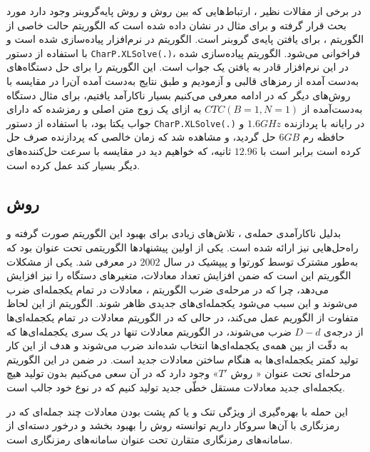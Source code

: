 در برخی از مقالات نظیر 
\cite{sugita2004relation}،
ارتباط‌هایی که بین روش 
و روش پایه‌گروبنر  وجود دارد مورد بحث قرار گرفته و  برای مثال در 
\cite{ars2004comparison}
نشان داده شده است که الگوریتم 
حالت خاصی از الگوریتم 
،
برای یافتن پایه‌ی گروبنر است.  الگوریتم 
در نرم‌افزار  
\cite{ApCoCoA}
پیاده‌سازی شده است و با  استفاده از دستور 
\texttt{CharP.XLSolve(.)}، 
فراخوانی می‌شود.   الگوریتم 
پیاده‌سازی شده در این نرم‌افزار قادر به یافتن یک جواب است. این الگوریتم را برای حل دستگاه‌های به‌دست آمده از رمز‌های قالبی 
و 
آزمودیم و طبق نتایج به‌دست آمده آن‌را در مقایسه با روش‌های دیگر که در ادامه معرفی می‌کنیم بسیار ناکارآمد یافتیم، برای مثال   دستگاه به‌دست‌آمده از 
$CTC(B = 1, N = 1)$
به ازای یک زوج متن اصلی و رمزشده که دارای جواب یکتا بود،  با استفاده از  دستور 
\texttt{CharP.XLSolve(.)}
در رایانه با پردازنده 
$1.6GHz$
و  حافظه رم 
$6GB$
حل گردید،  و مشاهده شد که زمان خالصی که پردازنده صرف حل کرده است برابر است  با  
$12.96$
ثانیه، که خواهیم دید در مقایسه با سرعت حل‌کننده‌های دیگر بسیار کند عمل کرده است. 

\subsection{روش }
بدلیل ناکارآمدی حمله‌ی  
،
تلاش‌های زیادی برای بهبود این الگوریتم صورت گرفته و راه‌حل‌هایی نیز ارائه شده است. یکی از اولین پیشنهادها الگوریتمی تحت عنوان 
بود که به‌طور مشترک توسط کورتوا و پیپشیک در سال 
$2002$
 در 
\cite{courtois2002cryptanalysis}
معرفی شد. یکی از مشکلات الگوریتم 
این است که ضمن افزایش تعداد معادلات، متغیرهای دستگاه را نیز افزایش می‌دهد، چرا که در مرحله‌ی ضرب الگوریتم 
، 
معادلات در تمام یکجمله‌ای ضرب می‌شوند و این سبب می‌شود یکجمله‌ای‌های جدیدی ظاهر شوند. الگوریتم 
از این لحاظ متفاوت از الگوریم 
عمل می‌کند، در حالی که در الگوریتم 
معادلات در تمام یکجمله‌ای‌ها از درجه‌ی 
$D-d$
ضرب می‌شوند، در الگوریتم 
معادلات تنها در یک سری یکجمله‌ای‌‌ها که به دقّت از بین همه‌ی یکجمله‌ای‌ها انتخاب شده‌اند ضرب می‌شوند و هدف از این کار تولید کمتر یکجمله‌ای‌ها به هنگام ساختن معادلات جدید است. در ضمن در این الگوریتم مرحله‌ای تحت عنوان «
روش
$T'$»
وجود دارد که در آن سعی می‌کنیم بدون تولید هیچ یکجمله‌ای جدید معادلات مستقل خطّی جدید تولید کنیم که در نوع خود جالب است. 


این حمله با بهره‌گیری از ویژگی تنک و یا کم پشت بودن معادلات چند جمله‌ای که در رمزنگاری با آن‌ها سروکار داریم توانسته روش 
را بهبود بخشد و درخور دسته‌ای از سامانه‌های رمزنگاری  متقارن تحت عنوان سامانه‌های رمزنگاری 
است.

